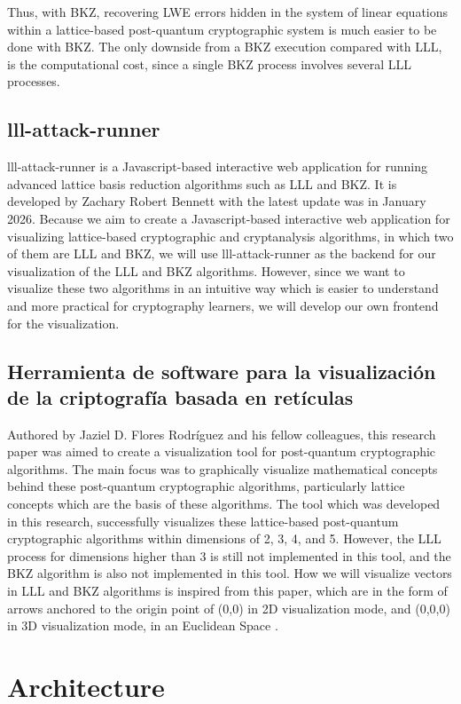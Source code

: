 \documentclass[runningheads]{llncs}
\begin{document}
Thus, with BKZ, recovering LWE errors hidden in the system of linear equations within a lattice-based post-quantum cryptographic system is much easier to be done with BKZ. The only downside from a BKZ execution compared with LLL, is the computational cost, since a single BKZ process involves several LLL processes. 

\subsection{lll-attack-runner}
lll-attack-runner is a Javascript-based interactive web application for running advanced lattice basis reduction algorithms such as LLL and BKZ. It is developed by Zachary Robert Bennett with the latest update was in January 2026. Because we aim to create a Javascript-based interactive web application for visualizing lattice-based cryptographic and cryptanalysis algorithms, in which two of them are LLL and BKZ, we will use lll-attack-runner as the backend for our visualization of the LLL and BKZ algorithms. However, since we want to visualize these two algorithms in an intuitive way which is easier to understand and more practical for cryptography learners, we will develop our own frontend for the visualization.

\subsection{Herramienta de software para la visualización
de la criptografía basada en retículas}
Authored by Jaziel D. Flores Rodríguez and his fellow colleagues, this research paper was aimed to create a visualization tool for post-quantum cryptographic algorithms. The main focus was to graphically visualize mathematical concepts behind these post-quantum cryptographic algorithms, particularly lattice concepts which are the basis of these algorithms. The tool which was developed in this research, successfully visualizes these lattice-based post-quantum cryptographic algorithms within dimensions of 2, 3, 4, and 5. However, the LLL process for dimensions higher than 3 is still not implemented in this tool, and the BKZ algorithm is also not implemented in this tool. How we will visualize vectors in LLL and BKZ algorithms is inspired from this paper, which are in the form of arrows anchored to the origin point of (0,0) in 2D visualization mode, and (0,0,0) in 3D visualization mode, in an Euclidean Space \cite{17}.

\section{Architecture}
\end{document}
